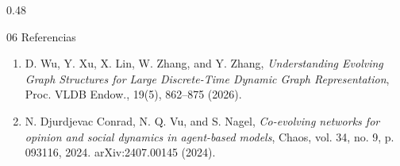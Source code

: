 \documentclass[final]{beamer}
\begin{document}
\begin{frame}[t]
\begin{columns}[t]
\begin{column}{0.48\paperwidth}
\begin{block}{06 Referencias}
\begin{enumerate}
\item D. Wu, Y. Xu, X. Lin, W. Zhang, and Y. Zhang, \emph{Understanding Evolving Graph Structures for Large Discrete-Time Dynamic Graph Representation}, Proc. VLDB Endow., 19(5), 862--875 (2026).
\item N. Djurdjevac Conrad, N. Q. Vu, and S. Nagel, \emph{Co-evolving networks for opinion and social dynamics in agent-based models}, Chaos, vol. 34, no. 9, p. 093116, 2024. arXiv:2407.00145 (2024).
\end{enumerate}
\end{block}

\end{column}

\end{columns}

\end{frame}
\end{document}
